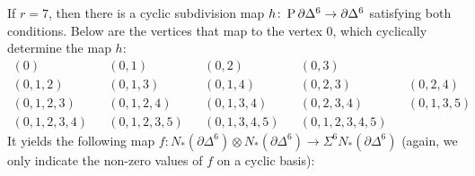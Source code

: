 If $r=7$, then there is a cyclic subdivision map $h\colon \operatorname{P} \partial \Delta^6\to \partial \Delta^6$ satisfying both conditions. Below are the vertices that map to the vertex $0$, which cyclically determine the map $h$:  
\begin{align*}
			(0) &&
			(0,1) &&
			(0,2) &&
			(0,3) \\
			(0,1,2) &&
			(0,1,3) &&
			(0,1,4) &&
			(0,2,3) &&
			(0,2,4) \\
			(0,1,2,3) &&
			(0,1,2,4) &&
			(0,1,3,4) &&
			(0,2,3,4) &&
			(0,1,3,5) \\
			(0,1,2,3,4) &&
			(0,1,2,3,5) &&
			(0,1,3,4,5) &&
			(0,1,2,3,4,5)
\end{align*}
It yields the following map $f\colon N_*(\partial \Delta^6)\otimes N_*(\partial \Delta^6)\to \Sigma^6N_*(\partial \Delta^6)$ (again, we only indicate the non-zero values of $f$ on a cyclic basis):
